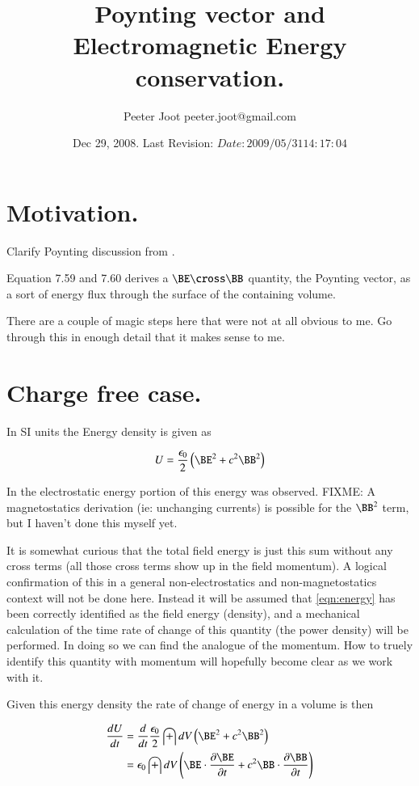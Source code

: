 \documentclass{article}
\title{ Poynting vector and Electromagnetic Energy conservation. }
\author{Peeter Joot \quad peeter.joot@gmail.com}
\date{ Dec 29, 2008.  Last Revision: $Date: 2009/05/31 14:17:04 $ }
\begin{document}
\maketitle{}

\tableofcontents

\section{ Motivation. }

Clarify Poynting discussion from \cite{doran2003gap}.

Equation 7.59 and 7.60 derives a $\BE \cross \BB$ quantity, the Poynting vector, as a sort of energy flux through the surface of the containing volume.

There are a couple of magic steps here that were not at all obvious to me.  Go through this in enough detail that it makes sense to me.

\section{ Charge free case. }

In SI units the Energy density is given as

\begin{align}\label{eqn:energy}
U = \frac{\epsilon_0}{2}\left( \BE^2 + c^2 \BB^2 \right)
\end{align}

In \cite{PJelectricFieldEnergy} the electrostatic energy portion of this
energy was observed.
FIXME: A magnetostatics derivation (ie: unchanging currents)
is possible for the $\BB^2$ term, but I haven't done this myself yet.

It is somewhat curious that the total field energy is just this 
sum without any cross terms (all those cross terms show up in the
field momentum).  A logical confirmation of this in a general
non-electrostatics and non-magnetostatics context will not be done here.
Instead it will be assumed that \ref{eqn:energy} has been correctly identified
as the field energy (density), and a mechanical calculation of the time 
rate of change of this
quantity (the power density) will be performed.  In doing so we can find the
analogue of the momentum.  How to truely identify this quantity with momentum
will hopefully become clear as we work with it.

Given this energy density the rate of change of energy in a volume is then

\begin{align*}
\frac{dU}{dt} 
&= 
\frac{d}{dt} 
\frac{\epsilon_0}{2} \int dV \left( \BE^2 + c^2 \BB^2 \right) \\
&= 
\epsilon_0 \int dV \left( \BE \cdot \PD{t}{\BE} + c^2 \BB \cdot \PD{t}{\BB} \right) \\
\end{align*}
\end{document}
